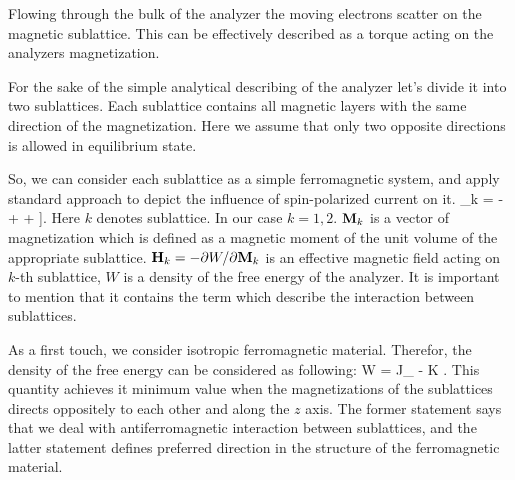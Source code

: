 Flowing through the bulk of the analyzer the moving electrons scatter on the magnetic sublattice. This can be effectively described as a torque acting on the analyzers magnetization.

For the sake of the simple analytical describing of the analyzer let's divide it into two sublattices. Each sublattice contains all magnetic layers with the same direction of the magnetization. Here we assume that only two opposite directions is allowed in equilibrium state.

So, we can consider each sublattice as a simple ferromagnetic system, and apply standard approach to depict the influence of spin-polarized current on it.
\be
	\label{ eq:LLGS }
	_k =
			- \gamma {}
			+ 
			+ 
				\left[
					\mb{M}_k \times \left[ \mb{M}_k \times \uv{p}_k \right]
				\right].
\ee
Here $k$ denotes sublattice. In our case $k = 1, 2$. $\mathbf{ {M} }_k$ is a vector of magnetization which is defined as a magnetic moment of the unit volume of the appropriate sublattice. $\mathbf{ {H} }_k = -\partial W / \partial \mathbf{ {M} }_k$ is an effective magnetic field acting on $k$-th sublattice, $W$ is a density of the free energy of the analyzer. It is important to mention that it contains the term which describe the interaction between sublattices.

As a first touch, we consider isotropic ferromagnetic material. Therefor, the density of the free energy can be considered as following:
\be
	\label{ eq:free_enegy }
	W = J_ 
		-  K .
\ee
This quantity achieves it minimum value when the magnetizations of the sublattices directs oppositely to each other and along the $z$ axis. The former statement says that we deal with antiferromagnetic interaction between sublattices, and the latter statement defines preferred direction in the structure of the ferromagnetic material.














